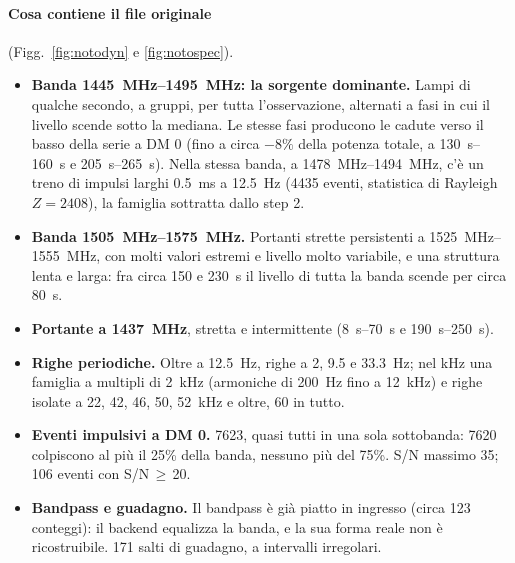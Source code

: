 \paragraph{Cosa contiene il file originale} (Figg.~\ref{fig:notodyn} e \ref{fig:notospec}).
\begin{itemize}
  \item \textbf{Banda \SIrange{1445}{1495}{\mega\hertz}: la sorgente dominante.} Lampi di qualche secondo, a gruppi,
    per tutta l'osservazione, alternati a fasi in cui il livello scende sotto la mediana. Le stesse fasi producono le
    cadute verso il basso della serie a DM 0 (fino a circa $-8\%$ della potenza totale, a
    \SIrange{130}{160}{\second} e \SIrange{205}{265}{\second}). Nella stessa banda, a \SIrange{1478}{1494}{\mega\hertz},
    c'è un treno di impulsi larghi \SI{0.5}{\milli\second} a \SI{12.5}{\hertz} (4435 eventi, statistica di Rayleigh
    $Z=2408$), la famiglia sottratta dallo step 2. 
  \item \textbf{Banda \SIrange{1505}{1575}{\mega\hertz}.} Portanti strette persistenti a \SIrange{1525}{1555}{\mega\hertz},
    con molti valori estremi e livello molto variabile, e una struttura lenta e larga: fra circa 150 e
    \SI{230}{\second} il livello di tutta la banda scende per circa \SI{80}{\second}. 
  \item \textbf{Portante a \SI{1437}{\mega\hertz}}, stretta e intermittente (\SIrange{8}{70}{\second} e
    \SIrange{190}{250}{\second}).
  \item \textbf{Righe periodiche.} Oltre a \SI{12.5}{\hertz}, righe a 2, 9.5 e \SI{33.3}{\hertz}; nel kHz una famiglia
    a multipli di \SI{2}{\kilo\hertz} (armoniche di \SI{200}{\hertz} fino a \SI{12}{\kilo\hertz}) e righe isolate a 22,
    42, 46, 50, \SI{52}{\kilo\hertz} e oltre, 60 in tutto. 
  \item \textbf{Eventi impulsivi a DM 0.} 7623, quasi tutti in una sola sottobanda: 7620 colpiscono al più il 25\% della
    banda, nessuno più del 75\%. S/N massimo 35; 106 eventi con S/N\,$\geq$\,20.
  \item \textbf{Bandpass e guadagno.} Il bandpass è già piatto in ingresso (circa 123 conteggi): il backend equalizza
    la banda, e la sua forma reale non è ricostruibile. 171 salti di guadagno, a intervalli irregolari.
\end{itemize}

